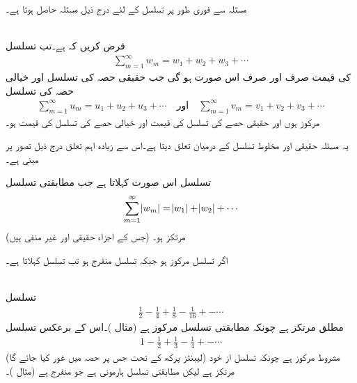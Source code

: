 مسئلہ  سے  فوری طور پر تسلسل کے لئے درج ذیل مسئلہ حاصل ہوتا ہے۔

\quad {}\\
فرض کریں کہ  ہے۔تب تسلسل
\begin{align*}
\sum_{m=1}^{\infty} w_m=w_1+w_2+w_3+\cdots
\end{align*}
کی قیمت صرف اور صرف اس صورت  ہو گی جب حقیقی حصہ کی تسلسل اور خیالی حصہ کی تسلسل 
\begin{align*}
\sum_{m=1}^{\infty} u_m=u_1+u_2+u_3+\cdots\quad \text{اور}\quad \sum_{m=1}^{\infty} v_m=v_1+v_2+v_3+\cdots
\end{align*}
مرکوز ہوں اور حقیقی حصے کی تسلسل کی قیمت  اور خیالی حصے کی تسلسل کی قیمت   ہو۔

یہ مسئلہ حقیقی اور مخلوط تسلسل کے درمیان تعلق دیتا ہے۔اس سے زیادہ اہم تعلق درج ذیل تصور پر مبنی ہے۔ 

تسلسل  اس صورت   کہلاتا ہے جب مطابقتی تسلسل
\begin{align}\label{مساوات_ترتیب_مطلق_مرتکز}
\sum_{m=1}^{\infty} \abs{w_m}=\abs{w_1}+\abs{w_2}+\cdots
\end{align}
(جس کے اجزاء حقیقی اور غیر منفی ہیں) مرتکز ہو۔

اگر تسلسل  مرکوز ہو جبکہ  تسلسل  منفرج ہو تب تسلسل    کہلاتا ہے۔

\quad {}\\
تسلسل
\begin{align*}
\frac{1}{2}-\frac{1}{4}+\frac{1}{8}-\frac{1}{16}+-\cdots
\end{align*}
مطلق مرتکز ہے چونکہ مطابقتی تسلسل  مرکوز ہے (مثال )۔اس کے برعکس تسلسل
\begin{align*}
1-\frac{1}{2}+\frac{1}{3}-\frac{1}{4}+-\cdots
\end{align*}
مشروط مرکوز ہے چونکہ تسلسل از خود  (لیبنٹز پرکھ  کے تحت جس پر حصہ  میں غور کیا جائے گا)   مرتکز ہے لیکن مطابقتی تسلسل  ہارمونی ہے جو منفرج ہے (مثال )۔

